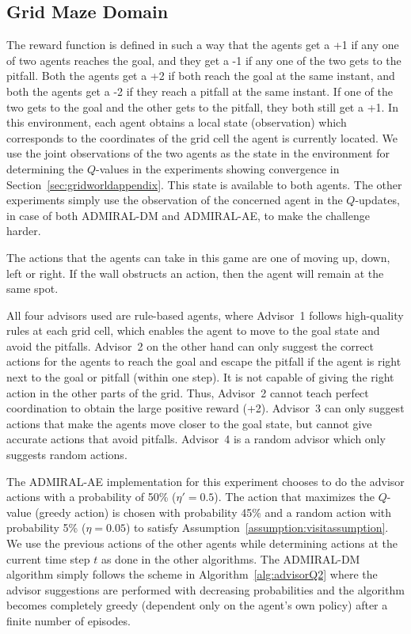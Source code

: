 \documentclass[jair, twoside,11pt,theapa]{article}
\begin{document}
\subsection{Grid Maze Domain}
The reward function is defined in such a way that the agents get a +1 if any one of two agents reaches the goal, and they get a -1 if any one of the two gets to the pitfall. Both the agents get a +2 if both reach the goal at the same instant, and both the agents get a -2 if they reach a pitfall at the same instant. If one of the two gets to the goal and the other gets to the pitfall, they both still get a +1. In this environment, each agent obtains a local state (observation) which corresponds to the coordinates of the grid cell the agent is currently located. We use the joint observations of the two agents as the state in the environment for determining the $Q$-values in the experiments showing convergence in Section~\ref{sec:gridworldappendix}. This state is available to both agents. The other experiments simply use the observation of the concerned agent in the $Q$-updates, in case of both ADMIRAL-DM and ADMIRAL-AE, to make the challenge harder.  

The actions that the agents can take in this game are one of moving up, down, left or right. If the wall obstructs an action, then the agent will remain at the same spot.

All four advisors used are rule-based agents, where Advisor~1 follows high-quality rules at each grid cell, which enables the agent to move to the goal state and avoid the pitfalls. Advisor~2 on the other hand can only suggest the correct actions for the agents to reach the goal and escape the pitfall if the agent is right next to the goal or pitfall (within one step). It is not capable of giving the right action in the other parts of the grid. Thus, Advisor~2 cannot teach perfect coordination to obtain the large positive reward (+2). Advisor~3 can only suggest actions that make the agents move closer to the goal state, but cannot give accurate actions that avoid pitfalls. Advisor~4 is a random advisor which only suggests random actions.

The ADMIRAL-AE implementation for this experiment chooses to do the advisor actions with a probability of 50\% ($\eta' = 0.5$). The action that maximizes the $Q$-value (greedy action) is chosen with probability 45\%  and a random action with probability 5\% ($\eta = 0.05$) to satisfy Assumption~\ref{assumption:visitassumption}. We use the previous actions of the other agents while determining actions at the current time step $t$ as done in the other algorithms. The ADMIRAL-DM algorithm simply follows the scheme in Algorithm~\ref{alg:advisorQ2} where the advisor suggestions are performed with decreasing probabilities and the algorithm becomes completely greedy (dependent only on the agent's own policy) after a finite number of episodes.   
\end{document}
